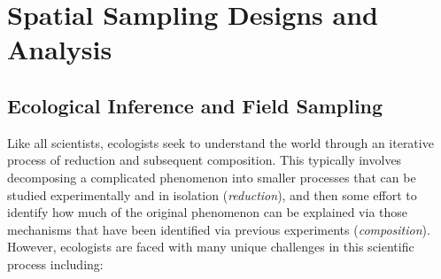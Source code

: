 
\chapter{Spatial Sampling Designs and Analysis}

\section{Ecological Inference and Field Sampling}

Like all scientists, ecologists seek to understand the world through an iterative process of reduction and subsequent composition.  This typically involves decomposing a complicated phenomenon into smaller processes that can be studied experimentally and in isolation (\textit{reduction}), and then some effort to identify how much of the original phenomenon can be explained via those mechanisms that have been identified via previous experiments (\textit{composition}).  However, ecologists are faced with many unique challenges in this scientific process including:

